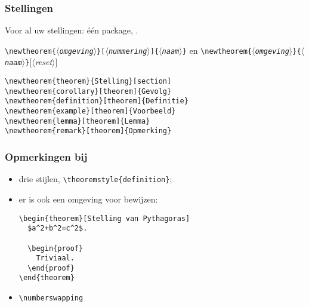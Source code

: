 \begin{frame}[fragile]
  \frametitle{Stellingen}

  Voor al uw stellingen: \'e\'en package, .

  \texttt{\textcolor{uagreen}{\textbackslash newtheorem}\{$\langle$\textsl{omgeving}$\rangle$\}[$\langle$\textsl{nummering}$\rangle$]\{$\langle$\textsl{naam}$\rangle$\}} en \texttt{\textcolor{uagreen}{\textbackslash newtheorem}\{$\langle$\textsl{omgeving}$\rangle$\}\{$\langle$\textsl{naam}$\rangle$\}}[$\langle$\textsl{reset}$\rangle$]

  \begin{verbatim}
\newtheorem{theorem}{Stelling}[section]
\newtheorem{corollary}[theorem]{Gevolg}
\newtheorem{definition}[theorem]{Definitie}
\newtheorem{example}[theorem]{Voorbeeld}
\newtheorem{lemma}[theorem]{Lemma}
\newtheorem{remark}[theorem]{Opmerking}
  \end{verbatim}
\end{frame}

\begin{frame}[fragile]
  \frametitle{Opmerkingen bij }

  \begin{itemize}
    \item drie stijlen, \texttt{\textcolor{uagreen}{\textbackslash theoremstyle}\{definition\}};
    \item er is ook een omgeving voor bewijzen:
      {\footnotesize
      \begin{verbatim}
\begin{theorem}[Stelling van Pythagoras]
  $a^2+b^2=c^2$.

  \begin{proof}
    Triviaal.  
  \end{proof}
\end{theorem}
      \end{verbatim}
      }
    \item \texttt{\textcolor{uagreen}{\textbackslash numberswapping}}
  \end{itemize}
\end{frame}
  
